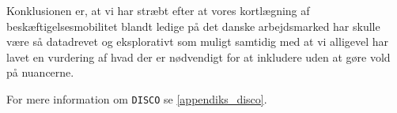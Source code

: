 \label{ledighedsrisiko} %












Konklusionen er, at vi har stræbt efter at vores kortlægning af beskæftigelsesmobilitet blandt ledige på det danske arbejdsmarked har skulle være så datadrevet og eksplorativt som muligt samtidig med at vi alligevel har lavet en vurdering af hvad der er nødvendigt for at inkludere uden at gøre vold på nuancerne.

For mere information om \texttt{DISCO} se \ref{appendiks_disco}.








